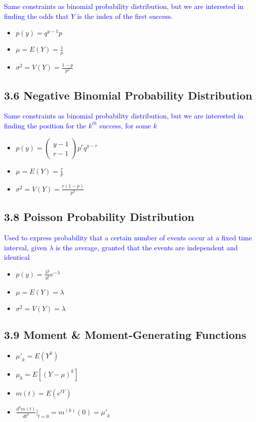 \documentclass[12pt]{article}
\newcommand\mm[1]{\begin{pmatrix}#1\end{pmatrix}}
\newcommand{\ddef}[1]{\textcolor{blue}{#1}}
\newcommand{\bbb}[1]{\left[#1\right]}
\begin{document}
\ddef{Same constraints as binomial probability distribution, but we are interested in finding the odds that $Y$ is the index of the first success.}

\begin{itemize}
	\item $p(y) = q^{y - 1}p$
	\item $\mu = E(Y) = \frac{1}{p}$
	\item $\sigma^2 = V(Y) = \frac{1 - p}{p^2}$
\end{itemize}

\subsection{3.6 Negative Binomial Probability Distribution}

\ddef{Same constraints as binomial probability distribution, but we are interested in finding the position for the $k^{th}$ success, for some $k$}

\begin{itemize}
	\item $p(y) = \mm{y - 1 \\ r - 1}p^rq^{y-r}$
	\item $\mu = E(Y) = \frac{r}{p}$
	\item $\sigma^2 = V(Y) = \frac{r(1 - p)}{p^2}$
\end{itemize}

\subsection{3.8 Poisson Probability Distribution}

\ddef{Used to express probability that a certain number of events occur at a fixed time interval, given $\lambda$ is the average, granted that the events are independent and identical}

\begin{itemize}
	\item $p(y) = \frac{\lambda^y}{y!}e^{-\lambda}$
	\item $\mu = E(Y) = \lambda$
	\item $\sigma^2 = V(Y) = \lambda$
\end{itemize}

\subsection{3.9 Moment \& Moment-Generating Functions}

\begin{itemize}
	\item ${\mu'}_k = E(Y^k)$
	\item $\mu_k = E\bbb{(Y - \mu)^k}$
	\item $m(t) = E(e^{tY})$
	\item $\frac{d^k m(t)}{dt^k}\big|_{t=0} = m^{(k)}(0) = {\mu'}_k$
\end{itemize}	
\end{document}
